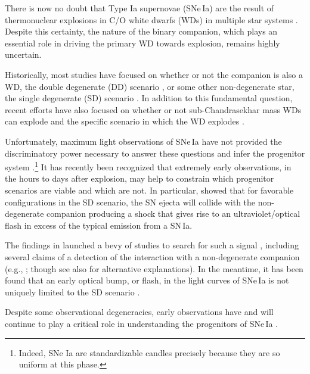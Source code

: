 \documentclass[twocolumn]{aastex63}
\begin{document}
There is now no doubt that Type Ia supernovae (SNe\,Ia) are the result of
thermonuclear explosions in C/O white dwarfs (WDs) in multiple star systems
\citep[see e.g.,][and references therein]{Maoz14}. Despite this certainty, the
nature of the binary companion, which plays an essential role in driving the
primary WD towards explosion, remains highly uncertain.

Historically, most studies have focused on whether or not the companion is
also a WD, the double degenerate (DD) scenario \citep[e.g.,][]{Webbink84}, or
some other non-degenerate star, the single degenerate (SD) scenario
\citep[e.g.,][]{Whelan73}. In addition to this fundamental question, recent
efforts have also focused on whether or not sub-Chandrasekhar mass WDs can
explode \citep[e.g.,][]{Fink10,Shen14,Scalzo14a,Polin19,Gronow20} and the
specific scenario in which the WD explodes \citep[see][and references
therein]{Hillebrandt13,Ropke18}.

Unfortunately, maximum light observations of SNe\,Ia have not provided the
discriminatory power necessary to answer these questions and infer the
progenitor system \citep[e.g.,][]{Ropke12}.\footnote{Indeed, SNe Ia are
standardizable candles precisely because they are so uniform at this phase.}
It has recently been recognized that extremely early observations, in the
hours to days after explosion, may help to constrain which progenitor
scenarios are viable and which are not. In particular, \citet{Kasen10a} showed
that for favorable configurations in the SD scenario, the SN ejecta will
collide with the non-degenerate companion producing a shock that gives rise to
an ultraviolet/optical flash in excess of the typical emission from a SN\,Ia.

The findings in \citet{Kasen10a} launched a bevy of studies to search for such
a signal \citep[e.g.,][]{Hayden10,Ganeshalingam11,Bianco11,Nugent11,Olling15},
including several claims of a detection of the interaction with a
non-degenerate companion (e.g.,
\citealt{Cao15,Marion16,Hosseinzadeh17,Dimitriadis19}; though see also
\citealt{Kromer16,Shappee18,Shappee19,Jiang18} for alternative explanations).
In the meantime, it has been found that an early optical bump, or flash, in
the light curves of SNe\,Ia is not uniquely limited to the SD scenario
\citep[e.g.,][]{Raskin13,Piro16,Levanon17,Noebauer17,Jiang17,Maeda18,Polin19,
De19,Magee20a}.

Despite some observational degeneracies, early observations have and will
continue to play a critical role in understanding the progenitors of SNe\,Ia
\citep[e.g., early photometry of SN\,2011fe constrained the size of the
exploding star to be $\lesssim 0.02$\,$R_\odot$, providing the most direct
evidence to date that SNe\,Ia come from WDs;][]{Bloom12a}.
\end{document}
